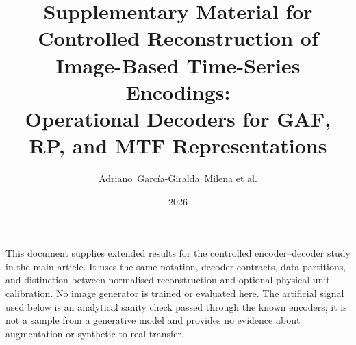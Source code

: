 \documentclass[10pt,a4paper,parskip=half-]{scrartcl}
\begin{document}
\title{Supplementary Material for\\Controlled Reconstruction of Image-Based Time-Series Encodings:\\Operational Decoders for GAF, RP, and MTF Representations}
\author{Adriano~García-Giralda~Milena et al.}
\date{2026}
\maketitle
\renewcommand{\thesection}{S\arabic{section}}
\renewcommand{\thesubsection}{S\arabic{section}.\arabic{subsection}}
\renewcommand{\thetable}{S\arabic{table}}
\renewcommand{\thefigure}{S\arabic{figure}}

This document supplies extended results for the controlled encoder--decoder study in the main article. It uses the same notation, decoder contracts, data partitions, and distinction between normalised reconstruction and optional physical-unit calibration. No image generator is trained or evaluated here. The artificial signal used below is an analytical sanity check passed through the known encoders; it is not a sample from a generative model and provides no evidence about augmentation or synthetic-to-real transfer.
\end{document}
